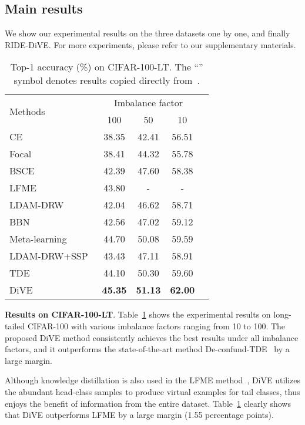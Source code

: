 \documentclass[10pt,twocolumn,letterpaper]{article}
\begin{document}
\subsection{Main results}\label{sec:main_results}

We show our experimental results on the three datasets one by one, and finally RIDE-DiVE. For more experiments, please refer to our supplementary materials.

\begin{table}
   \caption{Top-1 accuracy (\%) on CIFAR-100-LT. The ``\dag'' symbol denotes results copied directly from~\cite{zhou2020BBN}.}
   \centering
   \small
   \begin{tabular}{l|cccc}
      \hline
      \multirow{2}{*}{Methods} & \multicolumn{3}{c}{Imbalance factor}\\
	      & 100 & 50 & 10 \\
	   \hline \hline
	   CE & 38.35 & 42.41 & 56.51 \\
	   Focal~\cite{lin2017focal} & 38.41 & 44.32 & 55.78 \\
BSCE & 42.39 & 47.60 & 58.38  \\
	   \hline
	   LFME~\cite{xiang2020LFME} & 43.80 & - & - \\
	   LDAM-DRW~\cite{cao2019LDAM} & 42.04 & 46.62 & 58.71 \\
	   BBN~\cite{zhou2020BBN} & 42.56 & 47.02 & 59.12 \\
	   Meta-learning~\cite{jamal2020rethinkingclassbalance} & 44.70 & 50.08 & 59.59 \\
	   LDAM-DRW+SSP~\cite{yang2020rethinking} & 43.43 & 47.11 & 58.91 \\
	   TDE~\cite{tang2020longtailed} & 44.10 & 50.30 & 59.60  \\
	   \hline
	   DiVE & \textbf{45.35} & \textbf{51.13} & \textbf{62.00} \\
	   \hline 
   \end{tabular}
   \label{CIFAR100_result_table}
\end{table}

\textbf{Results on CIFAR-100-LT}.
Table~\ref{CIFAR100_result_table} shows the experimental results on long-tailed CIFAR-100 with various imbalance factors ranging from 10 to 100. The proposed DiVE method consistently achieves the best results under all imbalance factors, and it  outperforms the state-of-the-art method De-confund-TDE~\cite{tang2020longtailed} by a large margin.

Although knowledge distillation is also used in the LFME method~\cite{xiang2020LFME}, DiVE utilizes the abundant head-class samples to produce virtual examples for tail classes, thus enjoys the benefit of information from the entire dataset. Table~\ref{CIFAR100_result_table} clearly shows that DiVE outperforms LFME by a large margin (1.55 percentage points).
\end{document}
